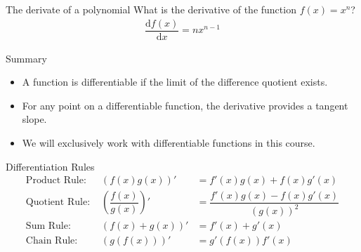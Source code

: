 \documentclass[notes]{beamer}
\begin{document}
    \begin{frame}{The derivate of a polynomial}
      What is the derivative of the function $f(x) = x^n$?
      \begin{align}
        \dfrac{\text{d}f(x)}{\text{d} x} = n x^{n-1}  
      \end{align}
    \end{frame}

    \begin{frame}{Summary}
      \begin{itemize}
        \item A function is differentiable if the limit of the difference quotient exists.
        \item For any point on a differentiable function, the derivative provides a tangent slope.
        \item We will exclusively work with differentiable functions in this course.
      \end{itemize}
    \end{frame}

    \begin{frame}{Differentiation Rules \cite{deisenroth2020mathematics}}
      \begin{align}
        \text{Product Rule:  }  &(f(x)g(x))'  &= f'(x)g(x) + f(x)g'(x) \\
        \text{Quotient Rule:  } &(\dfrac{f(x)}{g(x)})' &= \dfrac{f'(x)g(x) - f(x)g'(x)}{(g(x))^2}  \\
        \text{Sum Rule:  }      &(f(x) + g(x))' &= f'(x) + g'(x) \\
        \text{Chain Rule:  }    &(g(f(x)))'     &= g'(f(x))f'(x)
      \end{align}
    \end{frame}
\end{document}
